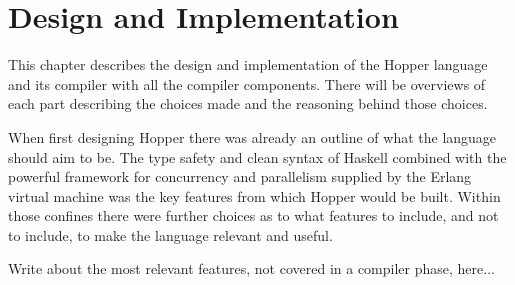 \chapter{Design and Implementation}


This chapter describes the design and implementation of the Hopper language and its compiler with all the compiler components. There will be overviews of each part describing the choices made and the reasoning behind those choices.

When first designing Hopper there was already an outline of what the language should aim to be. The type safety and clean syntax of Haskell combined with the powerful framework for concurrency and parallelism supplied by the Erlang virtual machine was the key features from which Hopper would be built. Within those confines there were further choices as to what features to include, and not to include, to make the language relevant and useful.


Write about the most relevant features, not covered in a compiler phase, here...







